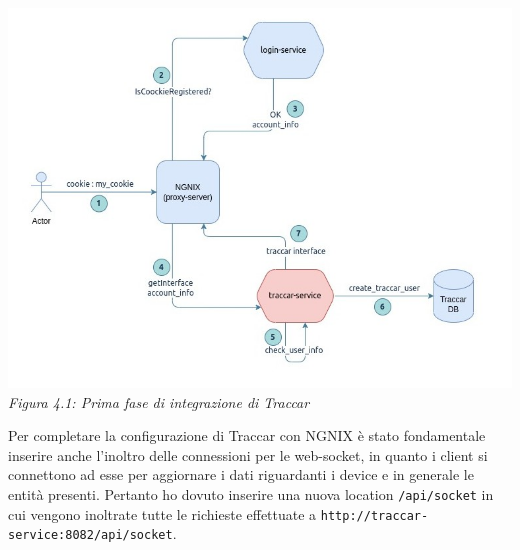 \documentclass[a4paper,titlepage,12pt]{report}
\begin{document}
{\begin{center}
\centering
\includegraphics[scale=0.55]{images/traccar_login_serv.jpg}\\ 
\textit{Figura 4.1: Prima fase di integrazione di Traccar}\label{fig:}

\end{center}

Per completare la configurazione di Traccar con NGNIX è stato fondamentale inserire anche l'inoltro delle connessioni per le web-socket, in quanto i client si connettono ad esse per aggiornare i dati riguardanti i device e in generale le entità presenti. Pertanto ho dovuto inserire una nuova location \texttt{/api/socket} in cui vengono inoltrate tutte le richieste effettuate a \texttt{http://traccar-service:8082/api/socket}.


}
\end{document}
